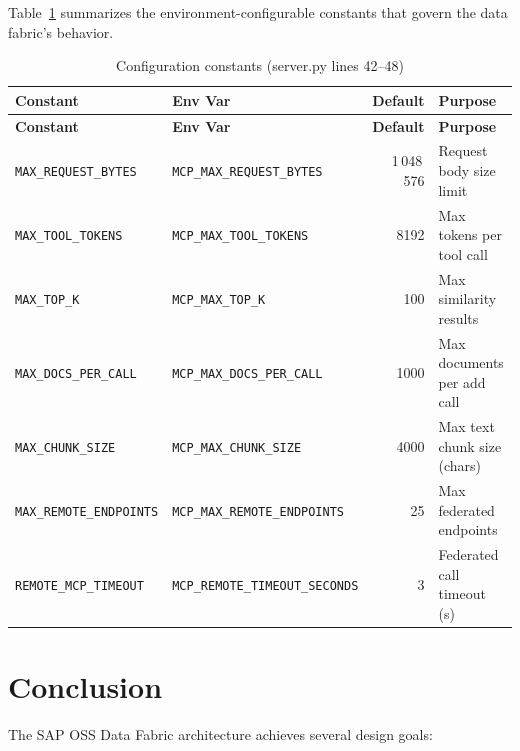 \documentclass[11pt]{article}
\newcommand{\code}[1]{\texttt{#1}}
\begin{document}
Table~\ref{tab:constants} summarizes the environment-configurable
constants that govern the data fabric's behavior.

\begin{longtable}{@{}llrl@{}}
\caption{Configuration constants (server.py lines 42--48)}
\label{tab:constants} \\
\toprule
\textbf{Constant} & \textbf{Env Var} & \textbf{Default} & \textbf{Purpose} \\
\midrule
\endfirsthead
\toprule
\textbf{Constant} & \textbf{Env Var} & \textbf{Default} & \textbf{Purpose} \\
\midrule
\endhead
\bottomrule
\endlastfoot
\code{MAX\_REQUEST\_BYTES}       & \code{MCP\_MAX\_REQUEST\_BYTES}    & 1\,048\,576 & Request body size limit \\
\code{MAX\_TOOL\_TOKENS}         & \code{MCP\_MAX\_TOOL\_TOKENS}      & 8192        & Max tokens per tool call \\
\code{MAX\_TOP\_K}               & \code{MCP\_MAX\_TOP\_K}            & 100         & Max similarity results \\
\code{MAX\_DOCS\_PER\_CALL}      & \code{MCP\_MAX\_DOCS\_PER\_CALL}   & 1000        & Max documents per add call \\
\code{MAX\_CHUNK\_SIZE}          & \code{MCP\_MAX\_CHUNK\_SIZE}       & 4000        & Max text chunk size (chars) \\
\code{MAX\_REMOTE\_ENDPOINTS}    & \code{MCP\_MAX\_REMOTE\_ENDPOINTS} & 25          & Max federated endpoints \\
\code{REMOTE\_MCP\_TIMEOUT}      & \code{MCP\_REMOTE\_TIMEOUT\_SECONDS} & 3         & Federated call timeout (s) \\
\end{longtable}


\section{Conclusion}
\label{sec:conclusion}

The SAP OSS Data Fabric architecture achieves several design goals:
\end{document}
